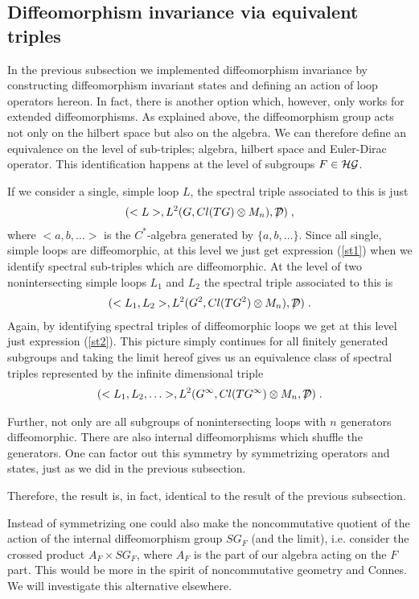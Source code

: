 \documentclass[12pt]{article}
\newcommand{\ba}{\begin{eqnarray}}
\newcommand{\ea}{\end{eqnarray}}
\def\cd{{\cal D}}
\def\cg{{\cal G}}
\def\ch{{\cal H}}
\begin{document}
\subsection{Diffeomorphism invariance via equivalent triples}








In the previous subsection we implemented diffeomorphism invariance by
constructing diffeomorphism invariant states and defining an action of loop
operators hereon. In fact, there is another option which, however, only works
for extended diffeomorphisms. As explained above, the diffeomorphism group
acts not only on the hilbert space but also on the algebra. We can therefore
define an equivalence on the level of sub-triples; algebra, hilbert space and
Euler-Dirac operator. This identification happens at the level of subgroups $F\in\ch\cg$.



If we consider a single, simple loop $L$, the spectral triple associated to
this is just 
\ba
(<L>, L^2(G,Cl(TG)\otimes M_n),\displaystyle{\not} \cd)\;,
\label{st1}
\ea
where $<a,b,\ldots>$ is the $C^*$-algebra generated by $\{a,b,\ldots\}$. Since
all single, simple loops are diffeomorphic, at this level we just get expression
(\ref{st1}) when we identify spectral sub-triples which are diffeomorphic. At
the level of two nonintersecting simple loops $L_1$ and $L_2$ the spectral
triple associated to this is
\ba
(<L_1,L_2>, L^2(G^2,Cl(TG^2)\otimes M_n),\displaystyle{\not} \cd)\;.
\label{st2}
\ea
Again, by identifying spectral triples of diffeomorphic loops we get at this
level just expression (\ref{st2}). This picture simply continues for all finitely
generated subgroups and taking the limit hereof gives us an equivalence class
of spectral triples represented by the infinite dimensional triple
\ba
(<L_1,L_2,\ldots>, L^2(G^\infty,Cl(TG^\infty)\otimes M_n,\displaystyle{\not} \cd)\;.
\label{triple}
\ea

Further, not only are all subgroups of nonintersecting loops with $n$
generators diffeomorphic. There are also internal diffeomorphisms which
shuffle the generators. One can factor out this symmetry by symmetrizing
operators and states, just as we did in the previous subsection.

Therefore, the result is, in fact, identical to the result of the previous subsection.

Instead of symmetrizing one could also make the noncommutative quotient of the
action of the internal diffeomorphism group $SG_F$ (and the limit),
i.e. consider the crossed product $A_F\times SG_F$, where $A_F$ is the part of
our algebra acting on the $F$ part. This would be more in the spirit of
noncommutative geometry and Connes. We will investigate this alternative elsewhere.
\end{document}
